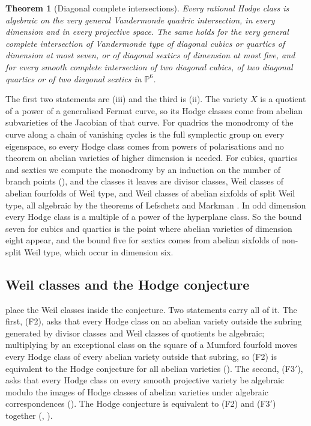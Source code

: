 \documentclass[11pt,reqno]{amsart}
\theoremstyle{plain}
\newtheorem{theorem}{Theorem}[section]
\theoremstyle{definition}
\theoremstyle{remark}
\newcommand{\PP}{\mathbb{P}}
\begin{document}
\begin{theorem}[Diagonal complete intersections]\label{thm:introvandermonde}
Every rational Hodge class is algebraic on the very general Vandermonde
quadric intersection, in every dimension and in every projective space. The
same holds for the very general complete intersection of Vandermonde type of
diagonal cubics or quartics of dimension at most seven, or of diagonal
sextics of dimension at most five, and for every smooth complete
intersection of two diagonal cubics, of two diagonal quartics or of two
diagonal sextics in $\PP^{6}$.
\end{theorem}

The first two statements are (iii) and the third is
(ii). The variety $X$ is a quotient of a power of a
generalised Fermat curve, so its Hodge classes come from abelian subvarieties
of the Jacobian of that curve. For quadrics the monodromy of the curve along
a chain of vanishing cycles is the full symplectic group on every eigenspace,
so every Hodge class comes from powers of polarisations and no theorem on
abelian varieties of higher dimension is needed. For cubics, quartics and
sextics we compute the monodromy by an induction on the number of branch
points (), and the classes it leaves are divisor
classes, Weil classes of abelian fourfolds of Weil type, and Weil classes of
abelian sixfolds of split Weil type, all algebraic by the theorems of
Lefschetz and Markman \cite{Mar25a,Mar25b}. In odd dimension every Hodge
class is a multiple of a power of the hyperplane class. So the bound seven
for cubics and quartics is the point where abelian varieties of dimension
eight appear, and the bound five for sextics comes from abelian sixfolds of
non-split Weil type, which occur in dimension six.



\subsection{Weil classes and the Hodge conjecture}

 place the Weil classes inside the
conjecture. Two
statements carry all of it. The first, (F2), asks that every Hodge class on an
abelian variety outside the subring generated by divisor classes and Weil
classes of quotients be algebraic; multiplying by an exceptional class on the
square of a Mumford fourfold moves every Hodge class of every abelian variety
outside that subring, so (F2) is equivalent to the Hodge conjecture for all
abelian varieties (). The second, (F3$'$), asks that every
Hodge class on every smooth projective variety be algebraic modulo the images
of Hodge classes of abelian varieties under algebraic correspondences
(). The Hodge conjecture is equivalent to (F2) and (F3$'$)
together (, ).
\end{document}
